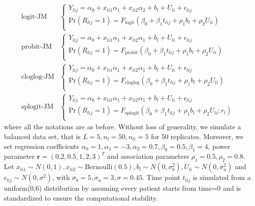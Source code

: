 \begin{align*}
\mbox{logit-JM} & \left \{\begin{array}{ll}
        Y_{lij}= \alpha_0 + x_{li1}\alpha_1 + x_{li2}\alpha_2 + b_l + U_{li} + \epsilon_{lij} \\
       \mbox{Pr}(R_{lij}=1)=F_{\mbox{logit}}(\beta_0 + \beta_1 t_{lij} + \rho_1 b_l + \rho_2 U_{li}) \\
\end{array}\right. \\
\mbox{probit-JM} & \left \{\begin{array}{ll}
       Y_{lij}= \alpha_0 + x_{li1}\alpha_1 + x_{li2}\alpha_1+b_l+U_{li} + \epsilon_{lij} \\
       \mbox{Pr}(R_{lij}=1)=F_{\mbox{probit}}(\beta_0 + \beta_1 t_{lij} +\rho_1 b_l + \rho_2 U_{li}) \\
\end{array}\right. \\
\mbox{cloglog-JM} & \left \{\begin{array}{ll}
       Y_{lij}= \alpha_0 + x_{li1}\alpha_1 + x_{li2}\alpha_1+b_l+U_{li} + \epsilon_{lij} \\
       \mbox{Pr}(R_{lij}=1)=F_{\mbox{cloglog}}(\beta_0 + \beta_1 t_{lij} + \rho_1 b_l + \rho_2 U_{li}) \\
        \end{array}\right.\\
\mbox{splogit-JM} & \left \{\begin{array}{ll}
       Y_{lij}= \alpha_0 + x_{li1}\alpha_1 + x_{li2}\alpha_1+b_l+U_{li} + \epsilon_{lij} \\
       \mbox{Pr}(R_{lij}=1)=F_{\mbox{splogit}}(\beta_0 + \beta_1 t_{lij} + \rho_1 b_l + \rho_2 U_{li};r_l) \\
       \end{array}\right.        
\end{align*}
where all the notations are as before. Without loss of generality, we simulate a balanced data set, that is $L=5,n_l=50, n_{li}=5$ for 50 replicates. Moreover, we set regression coefficients $\alpha_0=1, \alpha_1=-3, \alpha_2=0.7, \beta_0=0.5, \beta_1=4$, power parameter $\bm{r}=(0.2, 0.5, 1, 2, 3)^T$ and association parameters $\rho_1=0.5, \rho_2=0.8$. Let $x_{li1} \sim N(0,1), x_{li2} \sim \mbox{Bernoulli}(0.5), b_l \sim N(0,\sigma^2_b), U_{li} \sim N(0,\sigma^2_u)$ and $\epsilon_{lij} \sim N(0, \sigma^2)$, with $\sigma_b=5, \sigma_u=3, \sigma=0.45$. Time point $t_{lij}$ is simulated from a uniform(0,6) distribution by assuming every patient starts from time=0 and is standardized to ensure the computational stability.  

